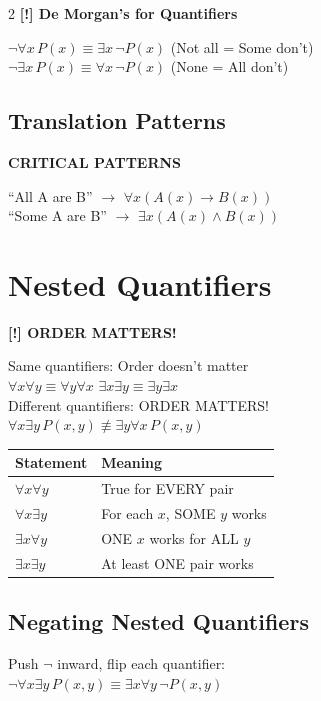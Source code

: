 \documentclass[8pt,a4paper]{article}
\newenvironment{tipbox}[1][]{\vspace{2pt}\noindent\textbf{#1}\par\smallskip}{\vspace{2pt}}
\newenvironment{warnbox}[1][]{\vspace{2pt}\noindent\textbf{[!] #1}\par\smallskip}{\vspace{2pt}}
\begin{document}
\begin{multicols}{2}
\begin{warnbox}[De Morgan's for Quantifiers]
$\neg \forall x\, P(x) \equiv \exists x\, \neg P(x)$ \quad (Not all = Some don't)\\
$\neg \exists x\, P(x) \equiv \forall x\, \neg P(x)$ \quad (None = All don't)
\end{warnbox}

\subsection{Translation Patterns}
\begin{tipbox}[CRITICAL PATTERNS]
``All A are B'' $\to$ $\forall x(A(x) \to B(x))$ \quad [Implication!]\\
``Some A are B'' $\to$ $\exists x(A(x) \land B(x))$ \quad [Conjunction!]
\end{tipbox}

\section{Nested Quantifiers}

\begin{warnbox}[ORDER MATTERS!]
Same quantifiers: Order doesn't matter\\
$\forall x \forall y \equiv \forall y \forall x$ \quad $\exists x \exists y \equiv \exists y \exists x$\\[3pt]
Different quantifiers: ORDER MATTERS!\\
$\forall x \exists y\, P(x,y) \not\equiv \exists y \forall x\, P(x,y)$
\end{warnbox}

\begin{center}
\scriptsize
\begin{tabular}{l|l}
\textbf{Statement} & \textbf{Meaning} \\
\hline
$\forall x \forall y$ & True for EVERY pair \\
$\forall x \exists y$ & For each $x$, SOME $y$ works \\
$\exists x \forall y$ & ONE $x$ works for ALL $y$ \\
$\exists x \exists y$ & At least ONE pair works \\
\end{tabular}
\end{center}

\subsection{Negating Nested Quantifiers}
Push $\neg$ inward, flip each quantifier:\\
$\neg \forall x \exists y\, P(x,y) \equiv \exists x \forall y\, \neg P(x,y)$


\end{multicols}
\end{document}
